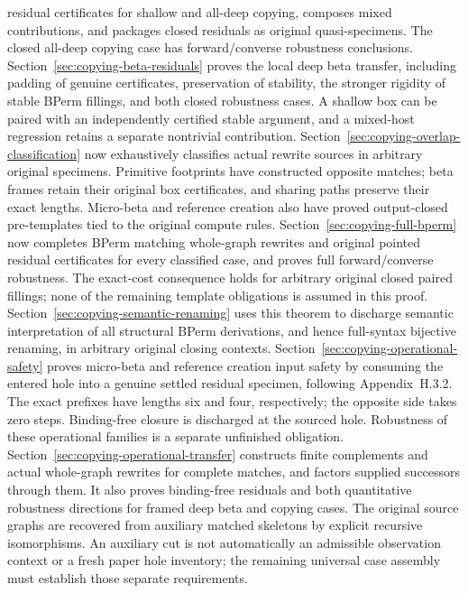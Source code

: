 residual certificates for shallow and all-deep copying, composes mixed
contributions, and packages closed residuals as original quasi-specimens.
The closed all-deep copying case has forward/converse robustness conclusions.
Section~\ref{sec:copying-beta-residuals} proves the local deep beta transfer,
including padding of genuine certificates, preservation of stability, the
stronger rigidity of stable BPerm fillings, and both closed robustness cases.
A shallow box can be paired with an independently certified stable argument,
and a mixed-host regression retains a separate nontrivial contribution.
Section~\ref{sec:copying-overlap-classification} now exhaustively classifies
actual rewrite sources in arbitrary original specimens. Primitive footprints
have constructed opposite matches; beta frames retain their original box
certificates, and sharing paths preserve their exact lengths. Micro-beta and
reference creation also have proved output-closed pre-templates tied to the
original compute rules. Section~\ref{sec:copying-full-bperm} now completes
BPerm matching whole-graph rewrites and original pointed residual certificates
for every classified case, and proves full forward/converse robustness.
The exact-cost consequence holds for arbitrary original closed paired fillings;
none of the remaining template obligations is assumed in this proof.
Section~\ref{sec:copying-semantic-renaming} uses this theorem to discharge
semantic interpretation of all structural BPerm derivations, and hence
full-syntax bijective renaming, in arbitrary original closing contexts.
Section~\ref{sec:copying-operational-safety} proves micro-beta and reference
creation input safety by consuming the entered hole into a genuine settled
residual specimen, following Appendix~H.3.2. The exact prefixes have lengths
six and four, respectively; the opposite side takes zero steps. Binding-free
closure is discharged at the sourced hole. Robustness of these operational
families is a separate unfinished obligation.
Section~\ref{sec:copying-operational-transfer} constructs finite complements
and actual whole-graph rewrites for complete matches, and factors supplied
successors through them. It also proves binding-free residuals and both
quantitative robustness directions for framed deep beta and copying cases.
The original source graphs are recovered from auxiliary matched skeletons
by explicit recursive isomorphisms. An auxiliary cut is not automatically
an admissible observation context or a fresh paper hole inventory; the
remaining universal case assembly must establish those separate requirements.

